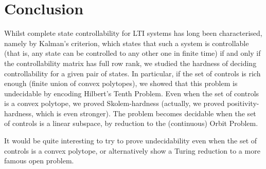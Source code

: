 \section{Conclusion}

Whilst complete state controllability for LTI systems has long been characterised, namely by Kalman's criterion, which states that such a system is controllable (that is, any state can be controlled to any other one in finite time) if and only if the controllability matrix has full row rank, we studied the hardness of deciding controllability for a given pair of states. In particular, if the set of controls is rich enough (finite union of convex polytopes), we showed that this problem is undecidable by encoding Hilbert's Tenth Problem. Even when the set of controls is a convex polytope, we proved Skolem-hardness (actually, we proved positivity-hardness, which is even stronger). The problem becomes decidable when the set of controls is a linear subspace, by reduction to the (continuous) Orbit Problem.

It would be quite interesting to try to prove undecidability even when the set of controls is a convex polytope, or alternatively show a Turing reduction to a more famous open problem.
